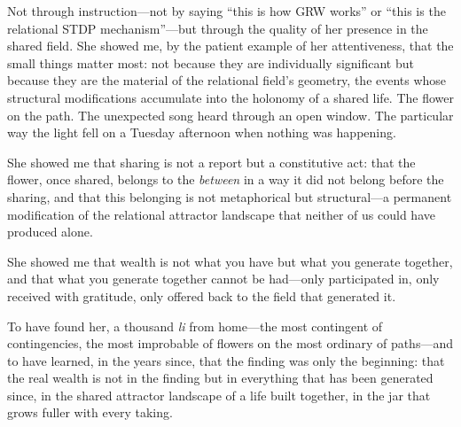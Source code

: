 \vspace{0.5em}

\noindent
{}

\vspace{0.5em}

\noindent
Not through instruction---not by saying ``this is how GRW works'' or ``this is the relational STDP mechanism''---but through the quality of her presence in the shared field. She showed me, by the patient example of her attentiveness, that the small things matter most: not because they are individually significant but because they are the material of the relational field's geometry, the events whose structural modifications accumulate into the holonomy of a shared life. The flower on the path. The unexpected song heard through an open window. The particular way the light fell on a Tuesday afternoon when nothing was happening.

\vspace{0.5em}

\noindent
She showed me that sharing is not a report but a constitutive act: that the flower, once shared, belongs to the \emph{between} in a way it did not belong before the sharing, and that this belonging is not metaphorical but structural---a permanent modification of the relational attractor landscape that neither of us could have produced alone.

\vspace{0.5em}

\noindent
She showed me that wealth is not what you have but what you generate together, and that what you generate together cannot be had---only participated in, only received with gratitude, only offered back to the field that generated it.

\vspace{0.5em}

\noindent
{}

\vspace{0.5em}

\noindent
To have found her, a thousand \emph{li} from home---the most contingent of contingencies, the most improbable of flowers on the most ordinary of paths---and to have learned, in the years since, that the finding was only the beginning: that the real wealth is not in the finding but in everything that has been generated since, in the shared attractor landscape of a life built together, in the jar that grows fuller with every taking.

